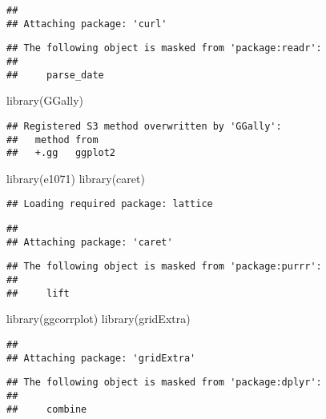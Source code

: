 \documentclass[
]{article}
\newenvironment{Shaded}{\begin{snugshade}}{\end{snugshade}}
\newcommand{\FunctionTok}[1]{\textcolor[rgb]{0.00,0.00,0.00}{#1}}
\newcommand{\NormalTok}[1]{#1}
\begin{document}
\begin{verbatim}
## 
## Attaching package: 'curl'
\end{verbatim}

\begin{verbatim}
## The following object is masked from 'package:readr':
## 
##     parse_date
\end{verbatim}

\begin{Shaded}
\begin{Highlighting}[]
\FunctionTok{library}\NormalTok{(GGally)}
\end{Highlighting}
\end{Shaded}

\begin{verbatim}
## Registered S3 method overwritten by 'GGally':
##   method from   
##   +.gg   ggplot2
\end{verbatim}

\begin{Shaded}
\begin{Highlighting}[]
\FunctionTok{library}\NormalTok{(e1071)}
\FunctionTok{library}\NormalTok{(caret)}
\end{Highlighting}
\end{Shaded}

\begin{verbatim}
## Loading required package: lattice
\end{verbatim}

\begin{verbatim}
## 
## Attaching package: 'caret'
\end{verbatim}

\begin{verbatim}
## The following object is masked from 'package:purrr':
## 
##     lift
\end{verbatim}

\begin{Shaded}
\begin{Highlighting}[]
\FunctionTok{library}\NormalTok{(ggcorrplot)}
\FunctionTok{library}\NormalTok{(gridExtra)}
\end{Highlighting}
\end{Shaded}

\begin{verbatim}
## 
## Attaching package: 'gridExtra'
\end{verbatim}

\begin{verbatim}
## The following object is masked from 'package:dplyr':
## 
##     combine
\end{verbatim}
\end{document}
